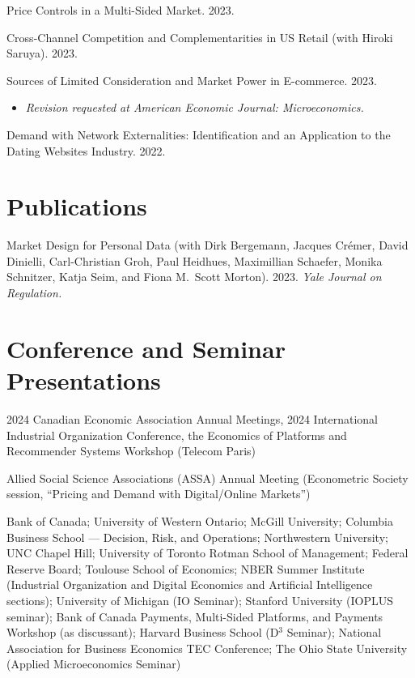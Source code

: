 \documentclass[11pt]{article} %
\begin{document}
Price Controls in a Multi-Sided Market. 2023. 

\medskip

Cross-Channel Competition and Complementarities in US Retail
(with Hiroki Saruya). 2023.

\medskip

Sources of Limited Consideration and Market Power in E-commerce. 2023.
\begin{itemize}
	\item \textit{Revision requested at American Economic Journal: Microeconomics.}
\end{itemize}
\medskip


 
Demand with Network Externalities: 
Identification and an Application to the Dating Websites Industry. 2022.




\section*{Publications}

Market Design for Personal Data
(with Dirk Bergemann, Jacques Cr\'{e}mer, David Dinielli, 
Carl-Christian Groh, Paul Heidhues, Maximillian Schaefer, 
Monika Schnitzer, Katja Seim, and Fiona M.\ Scott Morton).
2023. \textit{Yale Journal on Regulation.}




\section*{Conference and Seminar Presentations}

 2024 Canadian Economic Association Annual Meetings,
		2024 International Industrial Organization Conference,
		the Economics of Platforms and Recommender Systems Workshop (Telecom Paris)

 Allied Social Science Associations (ASSA) Annual Meeting
	(Econometric Society session, ``Pricing and Demand with Digital/Online Markets'')

 Bank of Canada; University of Western Ontario;
	McGill University; Columbia Business School --- Decision, Risk, and Operations;
	Northwestern University; UNC Chapel Hill; University of Toronto Rotman School
	of Management; Federal Reserve Board; Toulouse School of Economics;
	NBER Summer Institute (Industrial Organization and Digital Economics and Artificial
	Intelligence sections); University of Michigan (IO Seminar);
	Stanford University (IOPLUS seminar); Bank of Canada Payments, Multi-Sided Platforms, and Payments
	Workshop (as discussant); 
	Harvard Business School (D${}^3$ Seminar); 
	National Association for Business Economics TEC Conference;
	The Ohio State University (Applied Microeconomics Seminar)
\end{document}
